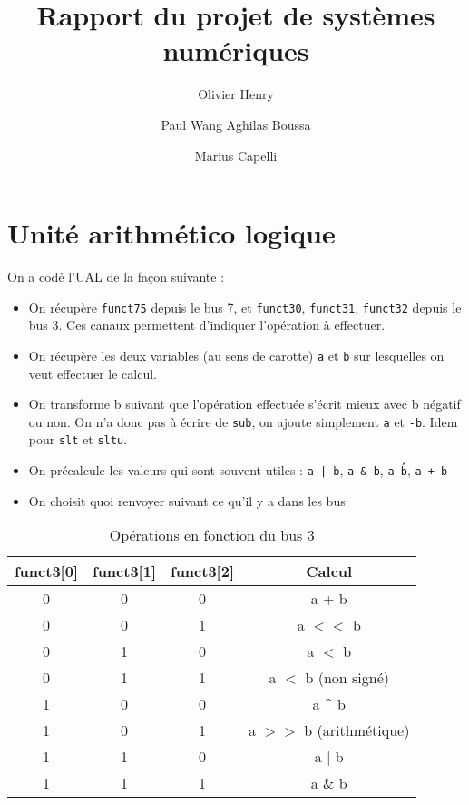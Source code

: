 \documentclass{article}
\author{
  Olivier Henry
  \and
  Paul Wang  
  Aghilas Boussa
  \and
  Marius Capelli
}
\date{}
\title{ Rapport du projet de systèmes numériques}
\begin{document}
\maketitle

\newpage

\section{Unité arithmético logique}

On a codé l'UAL de la façon suivante : 
\begin{itemize}
    \item On récupère \texttt{funct75} depuis le bus 7, et \texttt{funct30}, \texttt{funct31}, \texttt{funct32} depuis le bus 3. Ces canaux permettent d'indiquer l'opération à effectuer. 
    \item On récupère les deux variables (au sens de carotte) \texttt{a} et \texttt{b} sur lesquelles on veut effectuer le calcul. 
    \item On transforme b suivant que l'opération effectuée s'écrit mieux avec b négatif ou non. On n'a donc pas à écrire de \texttt{sub}, on ajoute simplement \texttt{a} et \texttt{-b}. Idem pour \texttt{slt} et \texttt{sltu}.
    \item On précalcule les valeurs qui sont souvent utiles : \texttt{a | b}, \texttt{a \& b}, \texttt{a \^ b}, \texttt{a + b}
    \item On choisit quoi renvoyer suivant ce qu'il y a dans les bus 
\end{itemize}


\begin{table}[h!]
\centering
\begin{tabular}{|c|c|c|c|}
\hline
\textbf{funct3[0]} & \textbf{funct3[1]} & \textbf{funct3[2]} & \textbf{Calcul} \\
\hline
0 & 0 & 0 & a + b \\
0 & 0 & 1 & a $<<$ b \\
0 & 1 & 0 & a $<$ b \\
0 & 1 & 1 & a $<$ b (non signé) \\
1 & 0 & 0 & a \^{} b \\
1 & 0 & 1 & a $>>$ b (arithmétique) \\
1 & 1 & 0 & a $|$ b \\
1 & 1 & 1 & a \& b \\
\hline
\end{tabular}
\caption{Opérations en fonction du bus 3}
\end{table}
\end{document}
